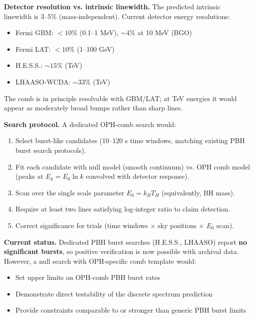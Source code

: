 \textbf{Detector resolution vs. intrinsic linewidth.} The predicted intrinsic linewidth is 3--5\% (mass-independent). Current detector energy resolutions:

\begin{itemize}
\tightlist
\item
  Fermi GBM: \(< 10\%\) (0.1--1 MeV), \(\sim 4\%\) at 10 MeV (BGO)
\item
  Fermi LAT: \(< 10\%\) (1--100 GeV)
\item
  H.E.S.S.: \(\sim 15\%\) (TeV)
\item
  LHAASO-WCDA: \(\sim 33\%\) (TeV)
\end{itemize}

The comb is in principle resolvable with GBM/LAT; at TeV energies it would appear as moderately broad bumps rather than sharp lines.

\textbf{Search protocol.} A dedicated OPH-comb search would:

\begin{enumerate}
\def\labelenumi{\arabic{enumi}.}
\tightlist
\item
  Select burst-like candidates (10--120 s time windows, matching existing PBH burst search protocols).
\item
  Fit each candidate with null model (smooth continuum) vs. OPH comb model (peaks at \(E_k = E_0 \ln k\) convolved with detector response).
\item
  Scan over the single scale parameter \(E_0 = k_B T_H\) (equivalently, BH mass).
\item
  Require at least two lines satisfying log-integer ratio to claim detection.
\item
  Correct significance for trials (time windows \(\times\) sky positions \(\times\) \(E_0\) scan).
\end{enumerate}

\textbf{Current status.} Dedicated PBH burst searches (H.E.S.S., LHAASO) report \textbf{no significant bursts}, so positive verification is now possible with archival data. However, a null search with OPH-specific comb template would:

\begin{itemize}
\tightlist
\item
  Set upper limits on OPH-comb PBH burst rates
\item
  Demonstrate direct testability of the discrete spectrum prediction
\item
  Provide constraints comparable to or stronger than generic PBH burst limits
\end{itemize}


